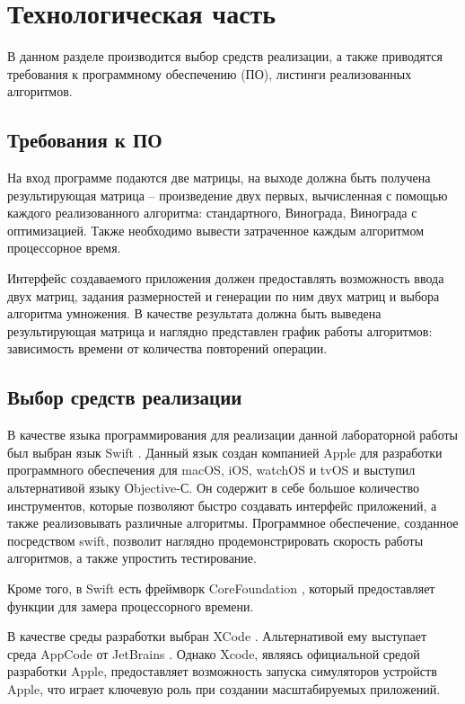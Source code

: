 \chapter{Технологическая часть}

В данном разделе производится выбор средств реализации, а также приводятся требования к программному обеспечению (ПО), листинги реализованных алгоритмов.

\section{Требования к ПО}

На вход программе подаются две матрицы, на выходе должна быть получена результирующая матрица -- произведение двух первых, вычисленная с помощью каждого реализованного алгоритма: стандартного, Винограда, Винограда с оптимизацией. Также необходимо вывести затраченное каждым алгоритмом процессорное время.

Интерфейс создаваемого приложения должен предоставлять возможность ввода двух матриц, задания размерностей и генерации по ним двух матриц и выбора алгоритма умножения. В качестве результата должна быть выведена результирующая матрица и наглядно представлен график работы алгоритмов: зависимость времени от количества повторений операции.

\section{Выбор средств реализации}

В качестве языка программирования для реализации данной лабораторной работы был выбран язык Swift \cite{swift}. Данный язык создан компанией Apple для разработки программного обеспечения для macOS, iOS, watchOS и tvOS и выступил альтернативой языку Оbjective-С. Он содержит в себе большое количество инструментов, которые позволяют быстро создавать интерфейс приложений, а также реализовывать различные алгоритмы. Программное обеспечение, созданное посредством swift, позволит наглядно продемонстрировать скорость работы алгоритмов, а также упростить тестирование.

Кроме того, в Swift есть фреймворк CoreFoundation \cite{core}, который предоставляет функции для замера процессорного времени.

В качестве среды разработки выбран XCode \cite{xcode}. Альтернативой ему выступает среда AppCode от JetBrains \cite{appcode}. Однако Xcode, являясь официальной средой разработки Apple, предоставляет возможность запуска симуляторов устройств Apple, что играет ключевую роль при создании масштабируемых приложений.  

